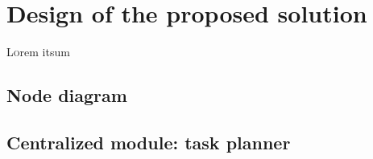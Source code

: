 \chapter{Design of the proposed solution}
\label{ch:DesignOfTheProposedSolution}
\lettrine[lraise=-0.1, lines=2, loversize=0.2]{L}{o}rem itsum



\section{Node diagram}
\label{sec:NodeDiagram}

\section{Centralized module: task planner}
\label{sec:Centralized module:TaskPlanner}

